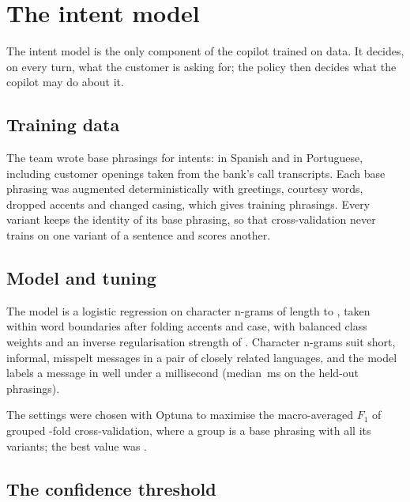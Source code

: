 \chapter{The intent model}\label{ch:intent}

The intent model is the only component of the copilot trained on data. It decides, on every turn, what the customer
is asking for; the policy then decides what the copilot may do about it.

\section{Training data}

The team wrote  base phrasings for  intents:
 in Spanish and  in Portuguese, including
 customer openings taken from the bank's call transcripts. Each base phrasing was
augmented deterministically with greetings, courtesy words, dropped accents and changed casing, which gives
 training phrasings. Every variant keeps the identity of its base phrasing, so that
cross-validation never trains on one variant of a sentence and scores another.

\section{Model and tuning}

The model is a logistic regression on character n-grams of length  to
, taken within word boundaries after folding accents and case, with balanced class weights
and an inverse regularisation strength of  \parencite{pedregosa2011}. Character n-grams suit
short, informal, misspelt messages in a pair of closely related languages, and the model labels a message in
well under a millisecond (median \,ms on the held-out phrasings).

The settings were chosen with Optuna \parencite{akiba2019} to maximise the macro-averaged $F_1$ of grouped
-fold cross-validation, where a group is a base phrasing with all its variants; the best value
was .

\section{The confidence threshold}


